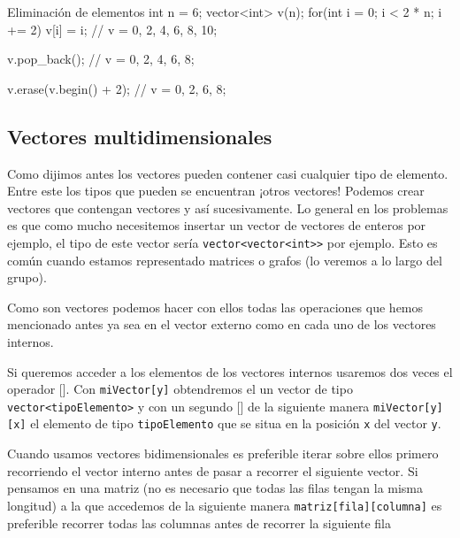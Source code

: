 \documentclass{article}
\begin{document}
    \begin{codelisting}{Eliminación de elementos}
int n = 6;        
vector<int> v(n);
for(int i = 0; i < 2 * n; i += 2) {
    v[i] = i;
}
// v = {0, 2, 4, 6, 8, 10};

v.pop_back(); // v = {0, 2, 4, 6, 8};

v.erase(v.begin() + 2); // v = {0, 2, 6, 8};
    \end{codelisting}

    \subsection{Vectores multidimensionales}

    Como dijimos antes los vectores pueden contener casi cualquier tipo de elemento. Entre este
    los tipos que pueden se encuentran ¡otros vectores! Podemos crear vectores que contengan vectores
    y así sucesivamente. Lo general en los problemas es que como mucho necesitemos insertar
    un vector de vectores de enteros por ejemplo, el tipo de este vector sería \texttt{vector<vector<int>>} 
    por ejemplo. Esto es común cuando estamos representado matrices o grafos (lo veremos a lo largo del grupo). 
    
    Como son vectores podemos hacer con ellos todas las operaciones que hemos mencionado antes ya sea en el vector
    externo como en cada uno de los vectores internos.

    Si queremos acceder a los elementos de los vectores internos usaremos dos veces el operador []. Con \texttt{miVector[y]}
    obtendremos el un vector de tipo \texttt{vector<tipoElemento>} y con un segundo [] de la siguiente manera 
    \texttt{miVector[y][x]} el elemento de tipo \texttt{tipoElemento} que se situa en la posición \texttt{x} del vector
    \texttt{y}.

    Cuando usamos vectores bidimensionales es preferible iterar sobre ellos primero recorriendo el vector interno antes
    de pasar a recorrer el siguiente vector. Si pensamos en una matriz (no es necesario que todas las filas tengan la misma longitud) a la que accedemos de la siguiente manera 
    \texttt{matriz[fila][columna]} es preferible recorrer todas las columnas antes de recorrer la siguiente fila
\end{document}
